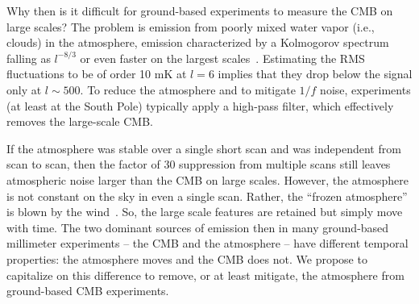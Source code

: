 Why then is it difficult for ground-based experiments to measure the CMB on large scales? The problem is emission from poorly mixed water vapor (i.e., clouds) in the atmosphere, emission characterized by a Kolmogorov spectrum falling as $l^{-8/3}$ or even faster on the largest scales~\cite{10.1093/mnras/272.3.551,Lay_2000}. Estimating the RMS fluctuations to be of order 10 mK at $l=6$  implies that they drop below the signal only at $l\sim 500$.  To reduce the atmosphere and to mitigate $1/f$ noise, experiments (at least at the South Pole) typically apply a high-pass filter, which effectively removes the large-scale CMB.

If the atmosphere was stable over a single short scan and was independent from scan to scan, then the factor of 30 suppression from multiple scans still leaves atmospheric noise larger than the CMB on large scales. However, the atmosphere is not constant on the sky in even a single scan. %
Rather, the ``frozen atmosphere'' is blown by the wind~\cite{Taylor1938,10.1093/mnras/272.3.551,Lay_2000,2005ApJ...622.1343B,Errard_2015,PhysRevD.105.042004}. So, the large scale features are retained but simply move with time.
The two dominant sources of emission then in many ground-based millimeter experiments -- the CMB and the atmosphere -- have different temporal properties: the atmosphere moves and the CMB does not. We propose to capitalize on this difference to remove, or at least mitigate, the atmosphere from ground-based CMB experiments.


